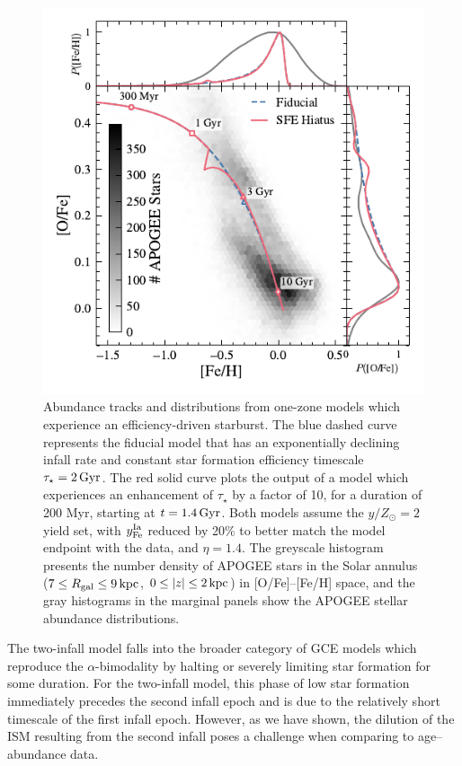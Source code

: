 \documentclass[twocolumn,twocolappendix,linenumbers]{aastex631}
\newcommand{\yZ}[1]{$y/Z_\odot=#1$}
\begin{document}
\begin{figure}
    \centering
    \includegraphics{figures/onezone_sfe_hiatus.pdf}
    \caption{Abundance tracks and distributions from one-zone models which experience an efficiency-driven starburst. The blue dashed curve represents the fiducial model that has an exponentially declining infall rate and constant star formation efficiency timescale $\tau_\star=2\,{\rm Gyr}$. The red solid curve plots the output of a model which experiences an enhancement of $\tau_\star$ by a factor of 10, for a duration of 200 Myr, starting at $t=1.4\,{\rm Gyr}$. Both models assume the \yZ{2} yield set, with $y_{\rm Fe}^{\rm Ia}$ reduced by 20\% to better match the model endpoint with the data, and $\eta=1.4$. The greyscale histogram presents the number density of APOGEE stars in the Solar annulus ($7\leq R_{\rm gal}\leq 9\,{\rm kpc}$, $0\leq|z|\leq2\,{\rm kpc}$) in [O/Fe]--[Fe/H] space, and the gray histograms in the marginal panels show the APOGEE stellar abundance distributions.}
    \label{fig:onezone-sfe-hiatus}
\end{figure}

The two-infall model falls into the broader category of GCE models which reproduce the $\alpha$-bimodality by halting or severely limiting star formation for some duration. For the two-infall model, this phase of low star formation immediately precedes the second infall epoch and is due to the relatively short timescale of the first infall epoch. However, as we have shown, the dilution of the ISM resulting from the second infall poses a challenge when comparing to age--abundance data.
\end{document}
